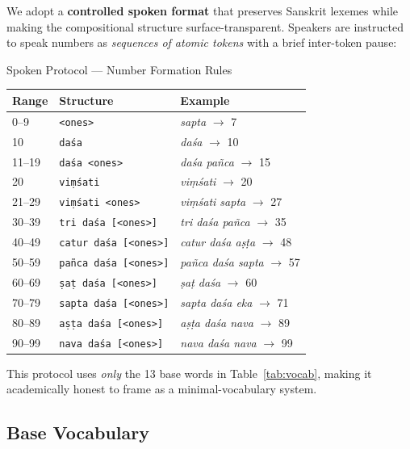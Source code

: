 \documentclass[12pt,a4paper]{article}
\begin{document}
We adopt a \textbf{controlled spoken format} that preserves Sanskrit lexemes
while making the compositional structure surface-transparent.
Speakers are instructed to speak numbers as \emph{sequences of atomic tokens}
with a brief inter-token pause:

\begin{keybox}{Spoken Protocol --- Number Formation Rules}
\begin{tabular}{@{}lll@{}}
\toprule
\textbf{Range} & \textbf{Structure} & \textbf{Example} \\
\midrule
0--9   & \texttt{<ones>}                         & \textit{sapta} $\to$ 7 \\
10     & \texttt{da\'{s}a}                        & \textit{da\'{s}a} $\to$ 10 \\
11--19 & \texttt{da\'{s}a <ones>}                 & \textit{da\'{s}a pa\~{n}ca} $\to$ 15 \\
20     & \texttt{vi\d{m}\'{s}ati}                 & \textit{vi\d{m}\'{s}ati} $\to$ 20 \\
21--29 & \texttt{vi\d{m}\'{s}ati <ones>}          & \textit{vi\d{m}\'{s}ati sapta} $\to$ 27 \\
30--39 & \texttt{tri da\'{s}a [<ones>]}           & \textit{tri da\'{s}a pa\~{n}ca} $\to$ 35 \\
40--49 & \texttt{catur da\'{s}a [<ones>]}         & \textit{catur da\'{s}a a\d{s}\d{t}a} $\to$ 48 \\
50--59 & \texttt{pa\~{n}ca da\'{s}a [<ones>]}     & \textit{pa\~{n}ca da\'{s}a sapta} $\to$ 57 \\
60--69 & \texttt{\d{s}a\d{t} da\'{s}a [<ones>]}  & \textit{\d{s}a\d{t} da\'{s}a} $\to$ 60 \\
70--79 & \texttt{sapta da\'{s}a [<ones>]}         & \textit{sapta da\'{s}a eka} $\to$ 71 \\
80--89 & \texttt{a\d{s}\d{t}a da\'{s}a [<ones>]} & \textit{a\d{s}\d{t}a da\'{s}a nava} $\to$ 89 \\
90--99 & \texttt{nava da\'{s}a [<ones>]}          & \textit{nava da\'{s}a nava} $\to$ 99 \\
\bottomrule
\end{tabular}
\end{keybox}

This protocol uses \emph{only} the 13 base words in Table~\ref{tab:vocab},
making it academically honest to frame as a minimal-vocabulary system.

\subsection{Base Vocabulary}
\label{sec:vocab}
\end{document}
